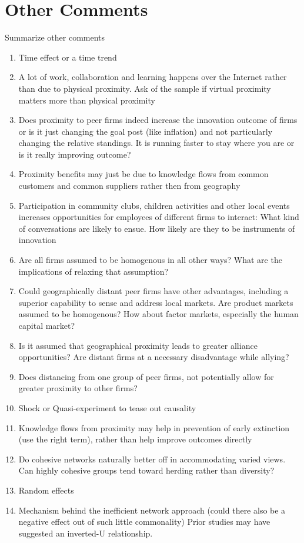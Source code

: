 \documentclass[12pt,letterpaper]{article}
\begin{document}
\section{Other Comments}
Summarize other comments
\begin{enumerate}
  \item Time effect or a time trend
  \item A lot of work, collaboration and learning happens over the Internet rather than due to physical proximity. Ask of the sample if virtual proximity matters more than physical proximity
  \item Does proximity to peer firms indeed increase the innovation outcome of firms or is it just changing the goal post (like inflation) and not particularly changing the relative standings. It is running faster to stay where you are or is it really improving outcome?
  \item Proximity benefits may just be due to knowledge flows from common customers and common suppliers rather then from geography
  \item Participation in community clubs, children activities and other local events increases opportunities for employees of different firms to interact: What kind of conversations are likely to ensue. How likely are they to be instruments of innovation
  \item Are all firms assumed to be homogenous in all other ways? What are the implications of relaxing that assumption?
  \item Could geographically distant peer firms have other advantages, including a superior capability to sense and address local markets. Are product markets assumed to be homogenous? How about factor markets, especially the human capital market?
  \item Is it assumed that geographical proximity leads to greater alliance opportunities? Are distant firms at a necessary disadvantage while allying?
  \item Does distancing from one group of peer firms, not potentially allow for greater proximity to other firms?

  \item Shock or Quasi-experiment to tease out causality
  \item Knowledge flows from proximity may help in prevention of early extinction (use the right term), rather than help improve outcomes directly
  \item Do cohesive networks naturally better off in accommodating varied views. Can highly cohesive groups tend toward herding rather than diversity?



  \item Random effects
  \item Mechanism behind the inefficient network approach (could there also be a negative effect out of such little commonality) Prior studies may have suggested an inverted-U relationship.
\end{enumerate}

\begin{singlespace}
\renewcommand{\refname}{REFERENCES}
 

\end{singlespace}
\end{document}
